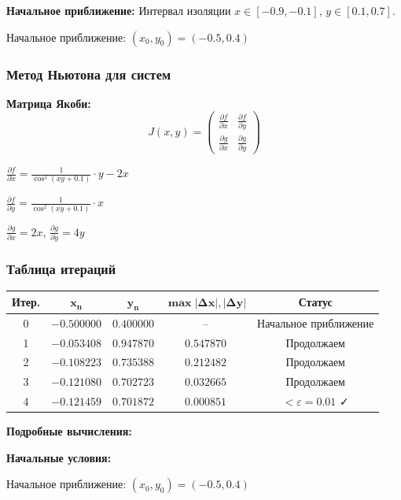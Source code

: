 \documentclass[a4paper,12pt]{article}
\begin{document}
\textbf{Начальное приближение:} Интервал изоляции $x \in [-0.9, -0.1]$, $y \in [0.1, 0.7]$. 

Начальное приближение: $(x_0, y_0) = (-0.5, 0.4)$

\subsubsection*{Метод Ньютона для систем}

\textbf{Матрица Якоби:}
\[
J(x,y) = \begin{pmatrix} \frac{\partial f}{\partial x} & \frac{\partial f}{\partial y} \\ \frac{\partial g}{\partial x} & \frac{\partial g}{\partial y} \end{pmatrix}
\]

$\frac{\partial f}{\partial x} = \frac{1}{\cos^2(xy+0.1)} \cdot y - 2x$

$\frac{\partial f}{\partial y} = \frac{1}{\cos^2(xy+0.1)} \cdot x$

$\frac{\partial g}{\partial x} = 2x$, $\frac{\partial g}{\partial y} = 4y$

\subsubsection*{Таблица итераций}

\begin{center}
\small
\begin{tabular}{|c|c|c|c|c|}
\hline
\textbf{Итер.} & $\mathbf{x_n}$ & $\mathbf{y_n}$ & $\mathbf{\max|\Delta x|, |\Delta y|}$ & \textbf{Статус} \\
\hline
0 & $-0.500000$ & $0.400000$ & -- & Начальное приближение \\
\hline
1 & $-0.053408$ & $0.947870$ & $0.547870$ & Продолжаем \\
\hline
2 & $-0.108223$ & $0.735388$ & $0.212482$ & Продолжаем \\
\hline
3 & $-0.121080$ & $0.702723$ & $0.032665$ & Продолжаем \\
\hline
4 & $-0.121459$ & $0.701872$ & $0.000851$ & $< \varepsilon = 0.01$ ✓ \\
\hline
\end{tabular}
\end{center}

\textbf{Подробные вычисления:}

\textbf{Начальные условия:}

Начальное приближение: $(x_0, y_0) = (-0.5, 0.4)$
\end{document}
